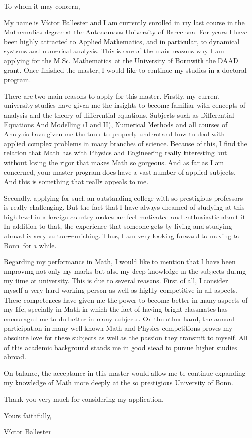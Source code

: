 \documentclass{letter}
\date{\today}
\newcommand{\master}{M.Sc. Mathematics}
\newcommand{\uni}{University of Bonn}
\newcommand{\city}{Bonn}
\newcommand{\scholar}{DAAD grant}
\begin{document}
\begin{letter}
  \hfill

  \opening{To whom it may concern,}
  \medskip

  My name is Víctor Ballester and I am currently enrolled in my last course in the Mathematics degree at the Autonomous University of Barcelona. For years I have been highly attracted to Applied Mathematics, and in particular, to dynamical systems and numerical analysis. This is one of the main reasons why I am applying for the \master\ at the \uni with the \scholar. Once finished the master, I would like to continue my studies in a doctoral program.

  There are two main reasons to apply for this master. Firstly, my current university studies have given me the insights to become familiar with concepts of analysis and the theory of differential equations. Subjects such as Differential Equations And Modelling (I and II), Numerical Methods and all courses of Analysis have given me the tools to properly understand how to deal with applied complex problems in many branches of science. Because of this, I find the relation that Math has with Physics and Engineering really interesting but without losing the rigor that makes Math so gorgeous. And as far as I am concerned, your master program does have a vast number of applied subjects. And this is something that really appeals to me.

  Secondly, applying for such an outstanding college with so prestigious professors is really challenging. But the fact that I have always dreamed of studying at this high level in a foreign country makes me feel motivated and enthusiastic about it. In addition to that, the experience that someone gets by living and studying abroad is very culture-enriching. Thus, I am very looking forward to moving to \city\ for a while.

  Regarding my performance in Math, I would like to mention that I have been improving not only my marks but also my deep knowledge in the subjects during my time at university. This is due to several reasons. First of all, I consider myself a very hard-working person as well as highly competitive in all aspects. These competences have given me the power to become better in many aspects of my life, specially in Math in which the fact of having bright classmates has encouraged me to do better in many subjects. On the other hand, the annual participation in many well-known Math and Physics competitions proves my absolute love for these subjects as well as the passion they transmit to myself. All of this academic background stands me in good stead to pursue higher studies abroad.


  On balance, the acceptance in this master would allow me to continue expanding my knowledge of Math more deeply at the so prestigious \uni.

  Thank you very much for considering my application.
  \bigskip

  Yours faithfully,

  Víctor Ballester

\end{letter}
\end{document}
